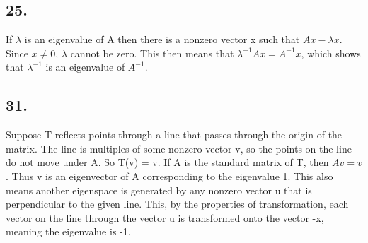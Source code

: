 \documentclass[12]{scrartcl}
\begin{document}
\subsection*{25.}
If $\lambda$ is an eigenvalue of A then there is a nonzero vector x such that $Ax - \lambda x$. Since $x \neq 0$, $\lambda$ cannot be zero. This then means that $\lambda^{-1} Ax = A^{-1}x$, which shows that $\lambda^{-1}$ is an eigenvalue of $A^{-1}$. 
\subsection*{31.}
Suppose T reflects points through a line that passes through the origin of the matrix. The line is multiples of some nonzero vector v, so the points on the line do not move under A. So T(v) = v. If A is the standard matrix of T, then $Av = v$. Thus v is an eigenvector of A corresponding to the eigenvalue 1. This also means another eigenspace is generated by any nonzero vector u that is perpendicular to the given line. This, by the properties of transformation, each vector on the line through the vector u is transformed onto the vector -x, meaning the eigenvalue is -1. 
\end{document}
